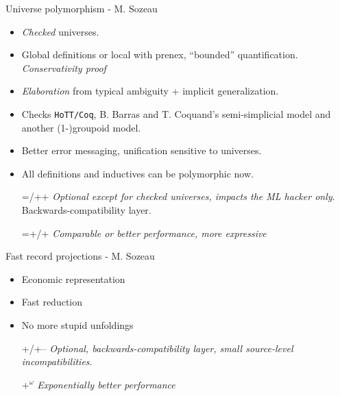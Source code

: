 \begin{subsecframe}{Universe polymorphism - M. Sozeau}
  \begin{itemize}
  \item \emph{Checked} universes.
  \item Global definitions or local with prenex, ``bounded''
    quantification. \emph{Conservativity proof}
  \item \emph{Elaboration} from typical ambiguity + implicit
    generalization.
  \item Checks \texttt{HoTT/Coq}, B. Barras and T. Coquand's semi-simplicial
    model and another (1-)groupoid model.
    \pause
  \item Better error messaging, unification sensitive to universes.
  \item All definitions and inductives can be polymorphic now.
  \end{itemize}

  \begin{itemize}
  \item[=/++] \emph{Optional except for checked
      universes, impacts the ML hacker only}. Backwards-compatibility layer.
  \item[=+/+] \emph{Comparable or better performance, more expressive}
  \end{itemize}
  
\end{subsecframe}

\begin{subsecframe}{Fast record projections - M. Sozeau}
  \begin{itemize}
  \item Economic representation
  \item Fast reduction
  \item No more stupid unfoldings
  \end{itemize}
  
  \begin{itemize}
  \item[+/+--] \emph{Optional, backwards-compatibility layer,
      small source-level incompatibilities}.
  \item[${+}^{ω}$] \emph{Exponentially better performance}
  \end{itemize}
\end{subsecframe}

